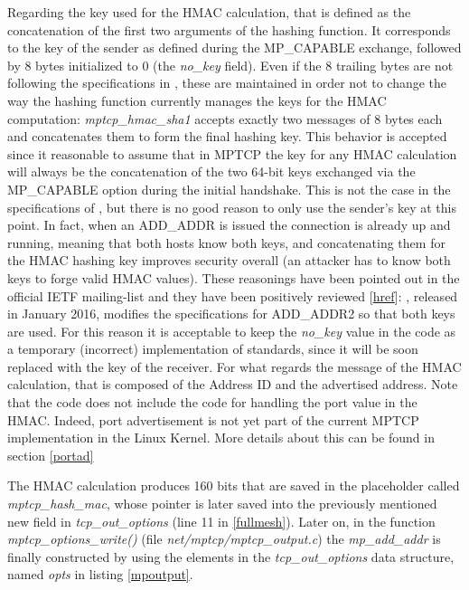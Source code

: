 Regarding the key used for the HMAC calculation, that is defined as the concatenation of the first two arguments of the hashing function. It corresponds to the key of the sender as defined during the MP\_CAPABLE exchange, followed by 8 bytes initialized to 0 (the \textit{no\_key} field). Even if the 8 trailing bytes are not following the specifications in , these are maintained in order not to change the way the hashing function currently manages the keys for the HMAC computation: \textit{mptcp\_hmac\_sha1} accepts exactly two messages of 8 bytes each and concatenates them to form the final hashing key. This behavior is accepted since it reasonable to assume that in MPTCP the key for any HMAC calculation will always be the concatenation of the two 64-bit keys exchanged via the MP\_CAPABLE option during the initial handshake. This is not the case in the specifications of , but there is no good reason to only use the sender's key at this point. In fact, when an ADD\_ADDR is issued the connection is already up and running, meaning that both hosts know both keys, and concatenating them for the HMAC hashing key improves security overall (an attacker has to know both keys to forge valid HMAC values). These reasonings have been pointed out in the official IETF mailing-list and they have been positively reviewed [\href{https://mailarchive.ietf.org/arch/search/?email_list=multipathtcp&q=RFC6824bis-04+ADD_ADDR2+comments}{href}]: , released in January 2016, modifies the specifications for ADD\_ADDR2 so that both keys are used. For this reason it is acceptable to keep the \textit{no\_key} value in the code as a temporary (incorrect) implementation of  standards, since it will be soon replaced with the key of the receiver. 
For what regards the message of the HMAC calculation, that is composed of the Address ID and the advertised address. Note that the code does not include the code for handling the port value in the HMAC. Indeed, port advertisement is not yet part of the current MPTCP implementation in the Linux Kernel. More details about this can be found in section \ref{portad}

The HMAC calculation produces 160 bits that are saved in the placeholder called \textit{mptcp\_hash\_mac}, whose pointer is later saved into the previously mentioned new field in \textit{tcp\_out\_options} (line 11 in \ref{fullmesh}).
Later on, in the function \textit{mptcp\_options\_write()} (file \textit{net/mptcp/mptcp\_output.c}) the \textit{mp\_add\_addr} is finally constructed by using the elements in the \textit{tcp\_out\_options} data structure, named \textit{opts} in listing \ref{mpoutput}.

